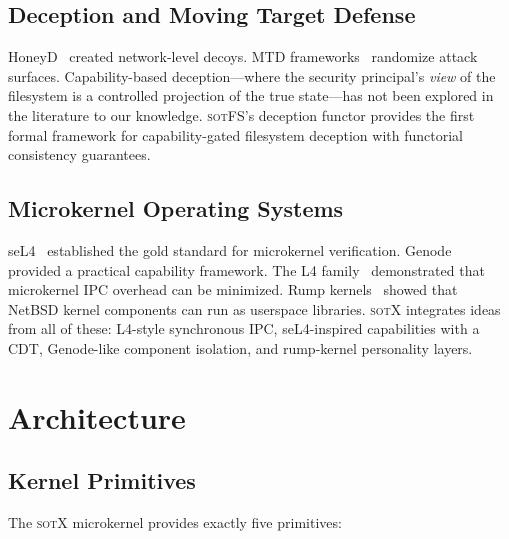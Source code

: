 \documentclass[11pt,a4paper]{article}
\theoremstyle{definition}
\theoremstyle{remark}
\newcommand{\sotfs}{\textsc{sotFS}}
\newcommand{\sotx}{\textsc{sotX}}
\begin{document}
\subsection{Deception and Moving Target Defense}

HoneyD~\cite{provos2004} created network-level decoys.
MTD frameworks~\cite{jajodia2011} randomize attack surfaces.
Capability-based deception---where the security principal's
\emph{view} of the filesystem is a controlled projection of the true
state---has not been explored in the literature to our knowledge.
\sotfs{}'s deception functor provides the first formal framework
for capability-gated filesystem deception with functorial consistency
guarantees.

\subsection{Microkernel Operating Systems}

seL4~\cite{klein2009} established the gold standard for microkernel
verification. Genode~\cite{feske2015} provided a practical capability
framework. The L4 family~\cite{liedtke1993} demonstrated that
microkernel IPC overhead can be minimized. Rump kernels~\cite{kantee2012}
showed that NetBSD kernel components can run as userspace libraries.
\sotx{} integrates ideas from all of these: L4-style synchronous
IPC, seL4-inspired capabilities with a CDT, Genode-like component
isolation, and rump-kernel personality layers.

\section{Architecture}
\label{sec:arch}

\subsection{Kernel Primitives}
\label{sec:arch-primitives}

The \sotx{} microkernel provides exactly five primitives:
\end{document}
